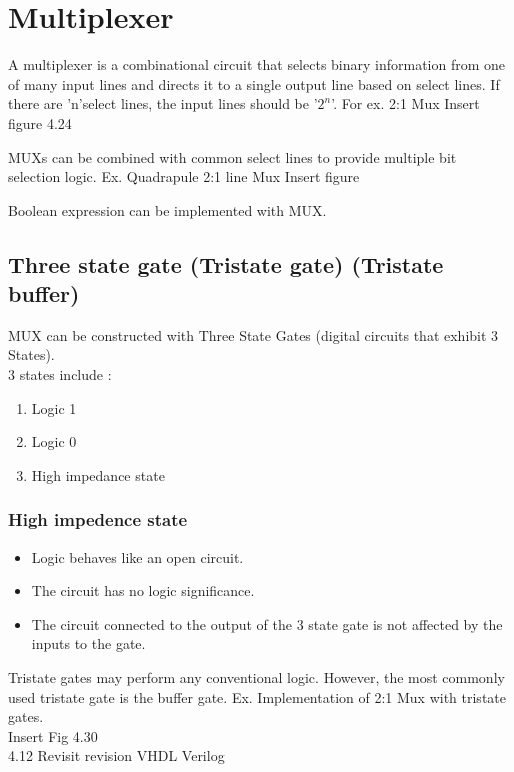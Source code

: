 \section{Multiplexer}
A multiplexer is a combinational circuit that selects binary information from one of many input lines and directs it to a single output line based on select lines. If there are 'n'select lines, the input lines should be '\(2^n\)'. For ex. 2:1 Mux 
Insert figure 4.24 

MUXs can be combined with common select lines to provide multiple bit selection logic. 
Ex. Quadrapule 2:1 line Mux 
Insert figure

Boolean expression can be implemented with MUX.
 
\subsection{Three state gate (Tristate gate) (Tristate buffer)} 
MUX can be constructed with Three State Gates (digital circuits that exhibit 3 States).\\
3 states include : 
\begin{enumerate}
    \item Logic 1 
    \item Logic 0
    \item High impedance state
\end{enumerate}

\subsubsection{High impedence state}
\begin{itemize}
    \item Logic behaves like an open circuit. 
    \item The circuit has no logic significance. 
    \item The circuit connected to the output of the 3 state gate is not affected by the inputs to the gate. 
\end{itemize}

Tristate gates may perform any conventional logic. However, the most commonly used tristate gate is the buffer gate. Ex. Implementation of 2:1 Mux with tristate gates.\\
Insert Fig 4.30\\
4.12 Revisit revision VHDL Verilog